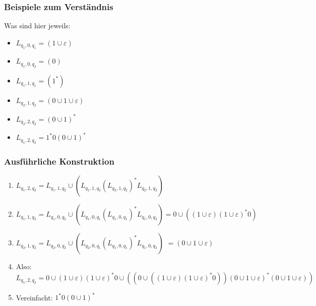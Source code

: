 \begin{frame}
\frametitle{Beispiele zum Verständnis}
\begin{figure}[H]
\begin{center}
\end{center}
\end{figure}

Was sind hier jeweils:

\begin{itemize}
\item $L_{q_1,0,q_1}$\pause $ = (1\cup\varepsilon)$
\item $L_{q_1,0,q_2}$\pause $ = (0)$
\item $L_{q_1,1,q_1}$\pause $ = (1^*)$
\item $L_{q_2,1,q_2}$\pause $ = (0\cup1\cup\varepsilon)$
\item $L_{q_2,2,q_2}$\pause $ = (0\cup1)^*$
\item $L_{q_1,2,q_2}$\pause $ = 1^*0(0\cup1)^*$
\end{itemize}
\end{frame}


\begin{frame}
\frametitle{Ausführliche Konstruktion}
\begin{figure}[H]
\begin{center}
\end{center}
\end{figure}
\begin{enumerate}
\item $L_{q_1,2,q_2} = L_{q_1,1,q_2}\cup(L_{q_1,1,q_2}(L_{q_2,1,q_2})^*L_{q_2,1,q_2})$
\item $L_{q_1,1,q_2} = L_{q_1,0,q_2}\cup(L_{q_1,0,q_1}(L_{q_1,0,q_1})^*L_{q_1,0,q_2}) = 0\cup((1\cup\varepsilon)(1\cup\varepsilon)^*0)$
\item $L_{q_2,1,q_2} = L_{q_2,0,q_2}\cup(L_{q_2,0,q_1}(L_{q_1,0,q_1})^*L_{q_1,0,q_2})$ $ = (0\cup1\cup\varepsilon)$
\item Also: $L_{q_1,2,q_2} = 0\cup(1\cup\varepsilon)(1\cup\varepsilon)^*0\cup((0\cup((1\cup\varepsilon)(1\cup\varepsilon)^*0))(0\cup1\cup\varepsilon)^*(0\cup1\cup\varepsilon))$
\item Vereinfacht: $1^*0(0\cup1)^*$
\end{enumerate}
\end{frame}

